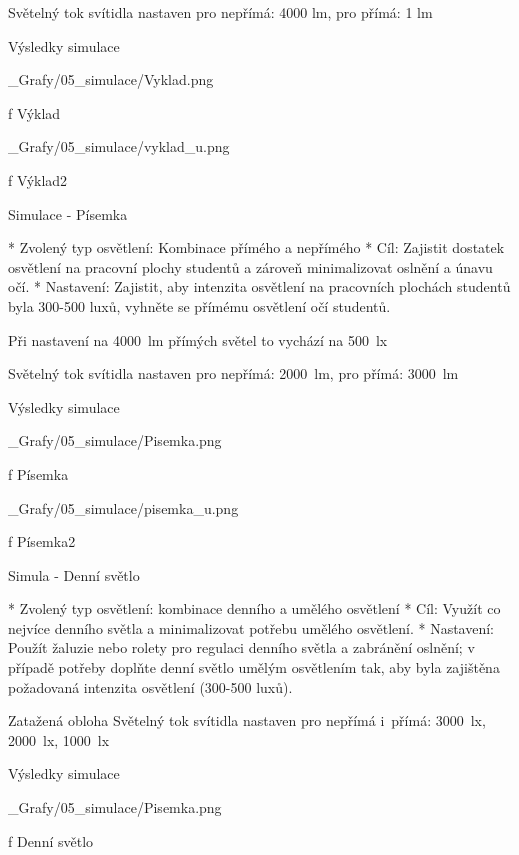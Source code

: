 \noindent Světelný tok svítidla nastaven pro nepřímá: 4000 lm, pro přímá: 1 lm

\secc Výsledky simulace

\medskip {}
\picw=10cm _Grafy/05_simulace/Vyklad.png
\caption/f Výklad
\medskip

\medskip {}
\picw=10cm _Grafy/05_simulace/vyklad_u.png
\caption/f Výklad2
\medskip

\sec Simulace - Písemka

\begitems
* Zvolený typ osvětlení: Kombinace přímého a nepřímého
* Cíl: Zajistit dostatek osvětlení na pracovní plochy studentů a zároveň minimalizovat oslnění a únavu očí.
* Nastavení: Zajistit, aby intenzita osvětlení na pracovních plochách studentů byla 300-500 luxů, vyhněte se přímému osvětlení očí studentů.
\enditems


\noindent Při nastavení na 4000~lm přímých světel to vychází na 500~lx

\noindent Světelný tok svítidla nastaven pro nepřímá: 2000~lm, pro přímá: 3000~lm

\secc Výsledky simulace

\medskip {}
\picw=10cm _Grafy/05_simulace/Pisemka.png
\caption/f Písemka
\medskip

\medskip {}
\picw=10cm _Grafy/05_simulace/pisemka_u.png
\caption/f Písemka2
\medskip

\sec Simula - Denní světlo

\begitems 
* Zvolený typ osvětlení: kombinace denního a umělého osvětlení
* Cíl: Využít co nejvíce denního světla a minimalizovat potřebu umělého osvětlení.
* Nastavení: Použít žaluzie nebo rolety pro regulaci denního světla a zabránění oslnění; v případě potřeby doplňte denní světlo umělým osvětlením tak, aby byla zajištěna požadovaná intenzita osvětlení (300-500 luxů).
\enditems

\noindent Zatažená obloha
\noindent Světelný tok svítidla nastaven pro nepřímá i~přímá: 3000~lx, 2000~lx, 1000~lx

\secc Výsledky simulace

\medskip {}
\picw=10cm _Grafy/05_simulace/Pisemka.png
\caption/f Denní světlo
\medskip


